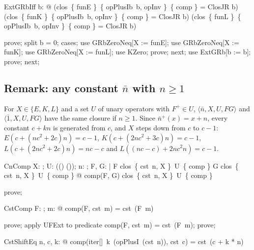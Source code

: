 \documentclass{article}
\begin{document}
\begin{theorem}{ExtGRbIff}
  \forall b: \nat @ (clos~\{ funE \}~\{ opPlusIb~b, opInv \}~\{ comp \} = ClosJR  \leq b) \land (clos~\{ funK \}~\{ opPlusIb~b, opInv \}~\{ comp \} = ClosJR  \leq b) \land (clos~\{ funL \}~\{ opPlusIb~b, opInv \}~\{ comp \} = ClosJR  \leq b)
\end{theorem}

\begin{zproof}
prove;
split b = 0;
cases;
use GRbZeroNeq[X := funE];
use GRbZeroNeq[X := funK];
use GRbZeroNeq[X := funL];
use KZero;
prove;
next;
use ExtGRb[b := b];
prove;
next;
\end{zproof}


\subsection{Remark: any constant $\bar n$ with $n \geq 1$}

For $X \in \{E, K, L\}$ and a set $U$ of unary operators with $F^+ \in U$,
$\langle \bar n, X, U, FG\rangle$ and $\langle \bar 1, X, U, FG\rangle$ have the same closure if
$n \geq 1$.  Since $\bar n^+(x) = x + n$, every constant $c + kn$ is generated from $c$, and $X$
steps down from $c$ to $c - 1$:
$E(c + (nc^2 + 2c)n) = c - 1$, $K(c + (2nc^2 + 3c)n) = c - 1$,
$L(c + (2nc^2 + 2c)n) = nc - c$ and $L((nc - c) + 2nc^2 n) = c - 1$.

\begin{theorem}{CnComp}
  \forall X: \nat \fun \nat; U: \power ((\nat \fun \nat) \fun (\nat \fun \nat)); n: \nat; F, G: \nat \fun \nat | F \in clos~\{ cst~n, X \}~U~\{ comp \} \land G \in clos~\{ cst~n, X \}~U~\{ comp \} @ comp(F, G) \in clos~\{ cst~n, X \}~U~\{ comp \}
\end{theorem}

\begin{zproof}
prove;
\end{zproof}

\begin{theorem}{CstComp}
  \forall F: \nat \fun \nat; m: \nat @ comp(F, cst~m) = cst~(F~m)
\end{theorem}

\begin{zproof}
prove;
apply UFExt to predicate comp(F, cst~m) = cst~(F~m);
prove;
\end{zproof}

\begin{theorem}{CstShiftEq}
  \forall n, c, k: \nat @ comp(iter[\nat]~k~(opPlusI~(cst~n)), cst~c) = cst~(c + k * n)
\end{theorem}
\end{document}
